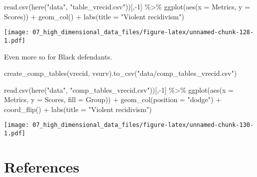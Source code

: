 \documentclass[
]{book}
\newenvironment{Shaded}{\begin{snugshade}}{\end{snugshade}}
\newcommand{\AttributeTok}[1]{\textcolor[rgb]{0.77,0.63,0.00}{#1}}
\newcommand{\DecValTok}[1]{\textcolor[rgb]{0.00,0.00,0.81}{#1}}
\newcommand{\FunctionTok}[1]{\textcolor[rgb]{0.00,0.00,0.00}{#1}}
\newcommand{\NormalTok}[1]{#1}
\newcommand{\SpecialCharTok}[1]{\textcolor[rgb]{0.00,0.00,0.00}{#1}}
\newcommand{\StringTok}[1]{\textcolor[rgb]{0.31,0.60,0.02}{#1}}
\begin{document}
\begin{Shaded}
\begin{Highlighting}[]
\FunctionTok{read.csv}\NormalTok{(}\FunctionTok{here}\NormalTok{(}\StringTok{"data"}\NormalTok{, }\StringTok{"table\_vrecid.csv"}\NormalTok{))[,}\SpecialCharTok{{-}}\DecValTok{1}\NormalTok{] }\SpecialCharTok{\%\textgreater{}\%}
  \FunctionTok{ggplot}\NormalTok{(}\FunctionTok{aes}\NormalTok{(}\AttributeTok{x =}\NormalTok{ Metrics, }\AttributeTok{y =}\NormalTok{ Scores)) }\SpecialCharTok{+}
  \FunctionTok{geom\_col}\NormalTok{() }\SpecialCharTok{+}
  \FunctionTok{labs}\NormalTok{(}\AttributeTok{title =} \StringTok{"Violent recidivism"}\NormalTok{)}
\end{Highlighting}
\end{Shaded}

\texttt{[image: 07\_high\_dimensional\_data\_files/figure-latex/unnamed-chunk-128-1.pdf]}

Even more so for Black defendants.

\begin{Shaded}
\begin{Highlighting}[]

\NormalTok{create\_comp\_tables(vrecid, vsurv).to\_csv(}\StringTok{"data/comp\_tables\_vrecid.csv"}\NormalTok{)}
\end{Highlighting}
\end{Shaded}

\begin{Shaded}
\begin{Highlighting}[]
\FunctionTok{read.csv}\NormalTok{(}\FunctionTok{here}\NormalTok{(}\StringTok{"data"}\NormalTok{, }\StringTok{"comp\_tables\_vrecid.csv"}\NormalTok{))[,}\SpecialCharTok{{-}}\DecValTok{1}\NormalTok{] }\SpecialCharTok{\%\textgreater{}\%}
  \FunctionTok{ggplot}\NormalTok{(}\FunctionTok{aes}\NormalTok{(}\AttributeTok{x =}\NormalTok{ Metrics, }\AttributeTok{y =}\NormalTok{ Scores, }\AttributeTok{fill =}\NormalTok{ Group)) }\SpecialCharTok{+}
  \FunctionTok{geom\_col}\NormalTok{(}\AttributeTok{position =} \StringTok{"dodge"}\NormalTok{) }\SpecialCharTok{+}
  \FunctionTok{coord\_flip}\NormalTok{() }\SpecialCharTok{+}
  \FunctionTok{labs}\NormalTok{(}\AttributeTok{title =} \StringTok{"Violent recidivism"}\NormalTok{)}
\end{Highlighting}
\end{Shaded}

\texttt{[image: 07\_high\_dimensional\_data\_files/figure-latex/unnamed-chunk-130-1.pdf]}

\hypertarget{references-5}{%
\section{References}\label{references-5}}
\end{document}
